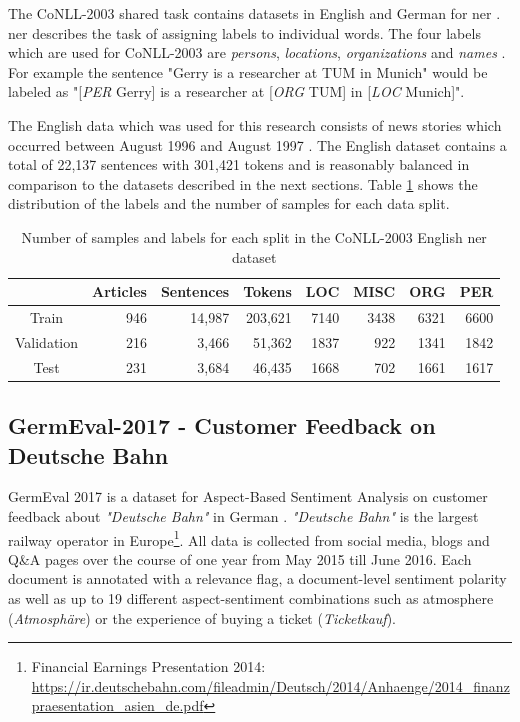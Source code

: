 The CoNLL-2003 shared task contains datasets in English and German for \acrfull{ner} \cite{Erik2003}. \gls{ner} describes the task of assigning labels to individual words. The four labels which are used for CoNLL-2003 are \textit{persons}, \textit{locations}, \textit{organizations} and \textit{names} \cite{Erik2003}. For example the sentence "Gerry is a researcher at TUM in Munich" would be labeled as "[\textit{PER} Gerry] is a researcher at [\textit{ORG} TUM] in [\textit{LOC} Munich]".
\medskip

The English data which was used for this research consists of news stories which occurred between August 1996 and August 1997 \cite{Erik2003}. The English dataset contains a total of 22,137 sentences with 301,421 tokens and is reasonably balanced in comparison to the datasets described in the next sections. Table \ref{tab:05_conll2003DatasetStats} shows the distribution of the labels and the number of samples for each data split.

\begin{table}
	\centering
	\begin{tabular}{crrrrrrr}
		\toprule
		& Articles & Sentences & Tokens & LOC & MISC & ORG & PER \\ 
		\midrule
		Train & 946 & 14,987 & 203,621 & 7140 & 3438 & 6321 & 6600 \\ 
		Validation & 216 & 3,466 & 51,362 & 1837 & 922 & 1341 & 1842 \\ 
		Test & 231 & 3,684 & 46,435 & 1668 & 702 & 1661 & 1617 \\ 
		\bottomrule 
	\end{tabular} 
\caption{Number of samples and labels for each split in the CoNLL-2003 English \gls{ner} dataset}
\label{tab:05_conll2003DatasetStats}
\end{table}


\subsection{GermEval-2017 - Customer Feedback on Deutsche Bahn}
\label{sec:05_germeval}
GermEval 2017 is a dataset for Aspect-Based Sentiment Analysis on customer feedback about \textit{"Deutsche Bahn"} in German \cite{Wojatzki2017}. \textit{"Deutsche Bahn"} is the largest railway operator in Europe\footnote{Financial Earnings Presentation 2014: \url{https://ir.deutschebahn.com/fileadmin/Deutsch/2014/Anhaenge/2014_finanzpraesentation_asien_de.pdf}}. All data is collected from social media, blogs and Q\&A pages over the course of one year from May 2015 till June 2016. Each document is annotated with a relevance flag, a document-level sentiment polarity as well as up to 19 different aspect-sentiment combinations such as atmosphere {(\textit{Atmosphäre})} or the experience of buying a ticket {(\textit{Ticketkauf})}.
\medskip

